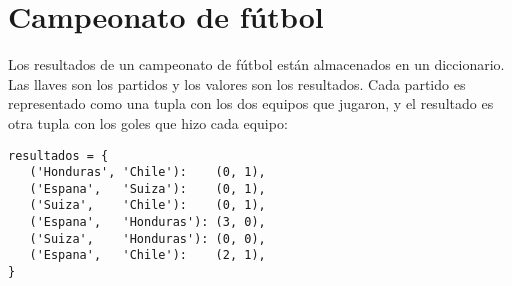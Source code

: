 \section{Campeonato de fútbol}

Los resultados de un campeonato de fútbol están almacenados en un
diccionario. Las llaves son los partidos y los valores son los
resultados. Cada partido es representado como una tupla con los dos
equipos que jugaron, y el resultado es otra tupla con los goles que hizo
cada equipo:
\begin{lstlisting}
resultados = {
   ('Honduras', 'Chile'):    (0, 1),
   ('Espana',   'Suiza'):    (0, 1),
   ('Suiza',    'Chile'):    (0, 1),
   ('Espana',   'Honduras'): (3, 0),
   ('Suiza',    'Honduras'): (0, 0),
   ('Espana',   'Chile'):    (2, 1),
}
\end{lstlisting}

